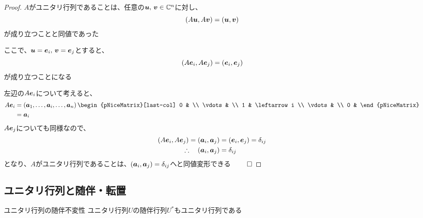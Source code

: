 \documentclass[../../../topic_linear-algebra]{subfiles}
\begin{document}
\begin{proof}
  $A$がユニタリ行列であることは、任意の$\vb*{u},\,\vb*{v} \in \mathbb{C}^n$に対し、
  \begin{equation*}
    (A\vb*{u}, A\vb*{v}) = (\vb*{u}, \vb*{v})
  \end{equation*}
  が成り立つことと同値であった

  ここで、$\vb*{u} = \vb*{e}_i,\, \vb*{v} = \vb*{e}_j$とすると、
  \begin{equation*}
    (A\vb*{e}_i, A\vb*{e}_j) = (\vb*{e}_i, \vb*{e}_j)
  \end{equation*}
  が成り立つことになる

  \br

  左辺の$A\vb*{e}_i$について考えると、
  \begin{align*}
    A\vb*{e}_i & = \left( \vb*{a}_1, \ldots, \vb*{a}_i, \ldots, \vb*{a}_n \right)
    \begin{pNiceMatrix}[last-col]
      0      &              \\
      \vdots &              \\
      1      & \leftarrow i \\
      \vdots &              \\
      0      &
    \end{pNiceMatrix}                                                  \\
               & = \vb*{a}_i
  \end{align*}
  $A\vb*{e}_j$についても同様なので、
  \begin{align*}
    (A\vb*{e}_i, A\vb*{e}_j) = (\vb*{a}_i, \vb*{a}_j) & = (\vb*{e}_i, \vb*{e}_j) = \delta_{ij} \\
    \therefore \quad (\vb*{a}_i, \vb*{a}_j)           & = \delta_{ij}
  \end{align*}
  となり、$A$がユニタリ行列であることは、$(\vb*{a}_i, \vb*{a}_j) = \delta_{ij}$へと同値変形できる $\qed$
\end{proof}

\subsection{ユニタリ行列と随伴・転置}

\begin{theorem*}{ユニタリ行列の随伴不変性}
  ユニタリ行列$U$の随伴行列$U^*$もユニタリ行列である
\end{theorem*}
\end{document}
